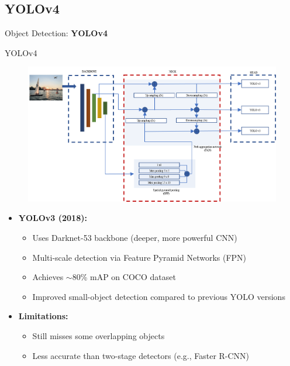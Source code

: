 \subsection{YOLOv4}
\begin{frame}{}
    \LARGE Object Detection: \textbf{YOLOv4}
\end{frame}

\begin{frame}[allowframebreaks]{YOLOv4}
    \begin{figure}
        \centering
        \includegraphics[width=1.0\textwidth,height=0.9\textheight,keepaspectratio]{images/object-detect/yolo-v4.png}
    \end{figure}
\framebreak
    \begin{itemize}
        \item \textbf{YOLOv3 (2018):}
        \begin{itemize}
            \item Uses Darknet-53 backbone (deeper, more powerful CNN)
            \item Multi-scale detection via Feature Pyramid Networks (FPN)
            \item Achieves $\sim$80\% mAP on COCO dataset
            \item Improved small-object detection compared to previous YOLO versions
        \end{itemize}
        \item \textbf{Limitations:}
        \begin{itemize}
            \item Still misses some overlapping objects
            \item Less accurate than two-stage detectors (e.g., Faster R-CNN)
        \end{itemize}
    \end{itemize}
\end{frame}

